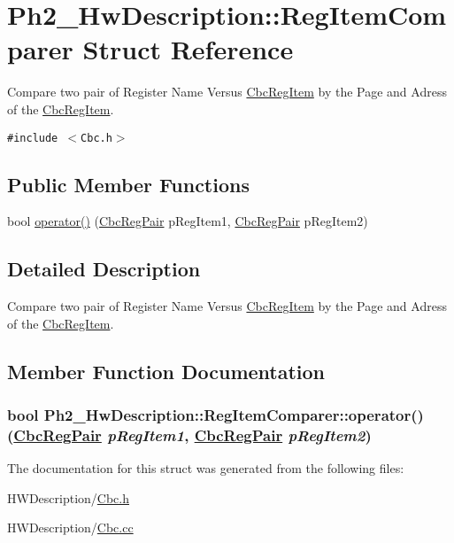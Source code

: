 \hypertarget{struct_ph2___hw_description_1_1_reg_item_comparer}{
\section{Ph2\_\-Hw\-Description::Reg\-Item\-Comparer Struct Reference}
\label{struct_ph2___hw_description_1_1_reg_item_comparer}
}
Compare two pair of Register Name Versus \hyperlink{struct_ph2___hw_description_1_1_cbc_reg_item}{Cbc\-Reg\-Item} by the Page and Adress of the \hyperlink{struct_ph2___hw_description_1_1_cbc_reg_item}{Cbc\-Reg\-Item}.  


{\tt \#include $<$Cbc.h$>$}

\subsection*{Public Member Functions}
\begin{CompactItemize}
\item 
bool \hyperlink{struct_ph2___hw_description_1_1_reg_item_comparer_ee3e1f2a92ae7431674b6307478c8c6f}{operator()} (\hyperlink{namespace_ph2___hw_description_78856413327152e693dceca249188d11}{Cbc\-Reg\-Pair} p\-Reg\-Item1, \hyperlink{namespace_ph2___hw_description_78856413327152e693dceca249188d11}{Cbc\-Reg\-Pair} p\-Reg\-Item2)
\end{CompactItemize}


\subsection{Detailed Description}
Compare two pair of Register Name Versus \hyperlink{struct_ph2___hw_description_1_1_cbc_reg_item}{Cbc\-Reg\-Item} by the Page and Adress of the \hyperlink{struct_ph2___hw_description_1_1_cbc_reg_item}{Cbc\-Reg\-Item}. 



\subsection{Member Function Documentation}
\hypertarget{struct_ph2___hw_description_1_1_reg_item_comparer_ee3e1f2a92ae7431674b6307478c8c6f}{
\subsubsection[operator()]{\setlength{\rightskip}{0pt plus 5cm}bool Ph2\_\-Hw\-Description::Reg\-Item\-Comparer::operator() (\hyperlink{namespace_ph2___hw_description_78856413327152e693dceca249188d11}{Cbc\-Reg\-Pair} {\em p\-Reg\-Item1}, \hyperlink{namespace_ph2___hw_description_78856413327152e693dceca249188d11}{Cbc\-Reg\-Pair} {\em p\-Reg\-Item2})}}
\label{struct_ph2___hw_description_1_1_reg_item_comparer_ee3e1f2a92ae7431674b6307478c8c6f}




The documentation for this struct was generated from the following files:\begin{CompactItemize}
\item 
HWDescription/\hyperlink{_cbc_8h}{Cbc.h}\item 
HWDescription/\hyperlink{_cbc_8cc}{Cbc.cc}\end{CompactItemize}
